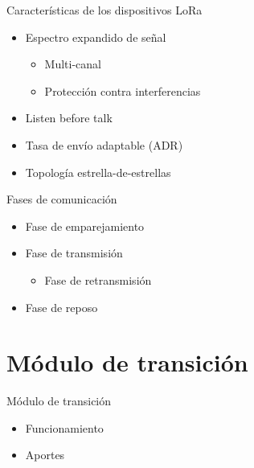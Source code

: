 \documentclass[10pt]{beamer}
\begin{document}
\begin{frame}[fragile]{Características de los dispositivos LoRa}
\begin{itemize}
\item Espectro expandido de señal
\begin{itemize}
\item Multi-canal
\item Protección contra interferencias
\end{itemize}
\item Listen before talk
\item Tasa de envío adaptable (ADR)
\item Topología estrella-de-estrellas
\end{itemize}
\end{frame}

\begin{frame}[fragile]{Fases de comunicación}
\begin{itemize}
\item Fase de emparejamiento
\item Fase de transmisión
\begin{itemize}
\item Fase de retransmisión
\end{itemize}
\item Fase de reposo
\end{itemize}
\end{frame}

\section{Módulo de transición}
\begin{frame}[fragile]{Módulo de transición}
\begin{itemize}
\item Funcionamiento
\item Aportes
\end{itemize}
\end{frame}
\end{document}
